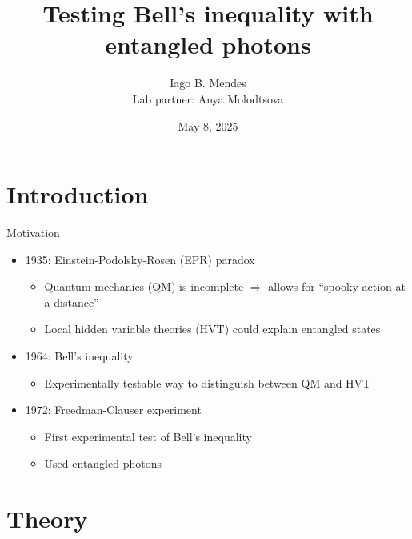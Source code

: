 \documentclass{../talk}
\title{Testing Bell's inequality with entangled photons}
\author[Iago B. Mendes]{Iago B. Mendes \\ Lab partner: Anya Molodtsova}
\date{May 8, 2025}
\begin{document}
\maketitle

\section{Introduction}

\begin{frame}{Motivation}
  \begin{itemize}
    \item 1935: Einstein-Podolsky-Rosen (EPR) paradox
      \begin{itemize}
        \item Quantum mechanics (QM) is incomplete $\Rightarrow$ allows for ``spooky action at a distance''
        \item Local hidden variable theories (HVT) could explain entangled states
      \end{itemize}
    \item<2-> 1964: Bell's inequality
      \begin{itemize}
        \item Experimentally testable way to distinguish between QM and HVT
      \end{itemize}
    \item<3-> 1972: Freedman-Clauser experiment
      \begin{itemize}
        \item First experimental test of Bell's inequality
        \item Used entangled photons
      \end{itemize}
  \end{itemize}
\end{frame}

\section{Theory}
\end{document}
